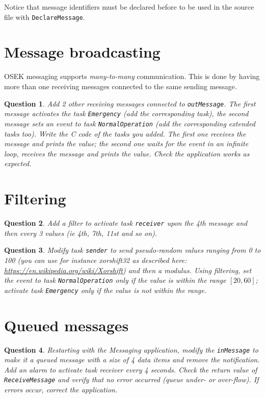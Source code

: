 \documentclass[11pt]{report}
\newtheorem{ex}{Question}
\begin{document}
Notice that message identifiers must be declared before to be used in the source file with \texttt{DeclareMessage}.

\section{Message broadcasting}

OSEK messaging supports \emph{many-to-many} communication. This is done by having more than one receiving messages connected to the same sending message.
\begin{ex}
Add 2 other receiving messages connected to \texttt{outMessage}. The first message activates the task \texttt{Emergency} (add the corresponding task), the second message sets an event to task \texttt{NormalOperation} (add the corresponding extended tasks too). Write the C code of the tasks you added. The first one receives the message and prints the value; the second one waits for the event in an infinite loop, receives the message and prints the value. Check the application works as expected.
\end{ex}

\section{Filtering}

\begin{ex}
Add a filter to activate task \texttt{receiver} upon the 4th message and then every 3 values (ie 4th, 7th, 11st and so on).
\end{ex}

\begin{ex}
    Modify task \texttt{sender} to send  pseudo-random values ranging from 0 to 100 (you can use for instance xorshift32 as described here: \url{https://en.wikipedia.org/wiki/Xorshift}) and then a modulus.
    Using filtering, set the event to task \texttt{NormalOperation} only if the value is within the range $[20,60]$; activate task \texttt{Emergency} only if the value is not within the range.
\end{ex}

\section{Queued messages}


\begin{ex}
    Restarting with the Messaging application, modify the \texttt{inMessage} to make it a queued message with a size of 4 data items and remove the notification. Add an alarm to activate task receiver every 4 seconds. Check the return value of \texttt{ReceiveMessage} and verify that no error occurred (queue under- or over-flow). If errors occur, correct the application.
\end{ex}
\end{document}
